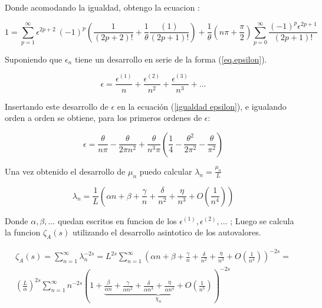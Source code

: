 Donde acomodando la igualdad, obtengo la ecuacion :

\begin{equation}
    1 = \sum _{p=1} ^{\infty} \epsilon ^{2p+2} \ (-1) ^p
    \left( 
    \frac{1}{(2p+2)!} + \frac{1}{\theta} \frac{(1 )}{(2p+1)!} 
    \right ) +
    \frac{1}{\theta} \left(n \pi + \frac{\pi}{2} \right)
    \sum _{p=0} ^{\infty} \frac{(-1) ^p \epsilon ^{2p+1}}{(2p+1) !}
\label{igualdad epsilon}
\end{equation}

Suponiendo que $\epsilon _n $ tiene un desarrollo en serie de la forma (\ref{eq.epsilon}).

\begin{equation}
    \epsilon = 
    \frac{\epsilon ^{(1)}}{n}  + 
    \frac{\epsilon ^{(2)}}{n ^2}  + 
    \frac{\epsilon ^{(3)}}{n ^3}  + ...
\label{eq.epsilon}
\end{equation}


Insertando este desarrollo de $\epsilon$ en la ecuación (\ref{igualdad epsilon}), e igualando orden a orden se obtiene, para los primeros ordenes de $\epsilon$:

\begin{equation}
    \epsilon  = \frac{\theta}{n \pi} 
     - \frac{ \theta}{2 \pi n ^2 } 
    + \frac{\theta}{n^3 \pi} 
        \left( \frac{1}{4} - 
        \frac{\theta ^2}{2 \pi ^2} -
        \frac{\theta}{\pi ^2}
        \right) 
\label{epsilons}
\end{equation}

Una vez obtenido el desarrollo de $\mu _n $ puedo calcular $\lambda _n = \frac{\mu _n }{L}  $ 



\begin{equation}
    \lambda _n = 
    \frac{1}{L}
    \left(
    \alpha n + 
    \beta + 
    \frac{\gamma}{n} +
    \frac{\delta}{n ^2} +
    \frac{\eta}{n^3} +
    O(\frac{1}{n^4} ) 
    \right)
\end{equation}
    
Donde $\alpha, \beta , ... $ quedan escritos en funcion de los $\epsilon ^{(1)},\epsilon^{(2)}, ... $ ; 
Luego se calcula la funcion $\zeta _A (s) $ utilizando el desarrollo asintotico de los autovalores.
    
\begin{equation}
\begin{array}{cc}
    \zeta _{A} (s) =  \sum _{n=1} ^{\infty} \lambda _n ^ {-2 s} =
    L ^{2s}
    \sum _{n=1} ^{\infty} 
    \left(
    \alpha n + 
    \beta + 
    \frac{\gamma}{n} +
    \frac{\delta}{n ^2} +
    \frac{\eta}{n^3} +
    O( \frac{1}{n ^{4} }  )
    \right) ^{-2 s} = \\
    ( \frac{L}{\alpha} ) ^{2s}    
    \sum _{n=1} ^{\infty} 
    n ^{- 2 s} 
    \left(
    1 +     
    \underbrace{
        \frac{\beta}{\alpha n} + 
        \frac{\gamma}{\alpha n^2} +
        \frac{\delta}{\alpha n ^3} +
        \frac{\eta}{\alpha n^4} +
        O(\frac{1}{n ^{5}} ) } _{ \chi _n}
    \right ) ^{-2 s}
\end{array}
\end{equation}

